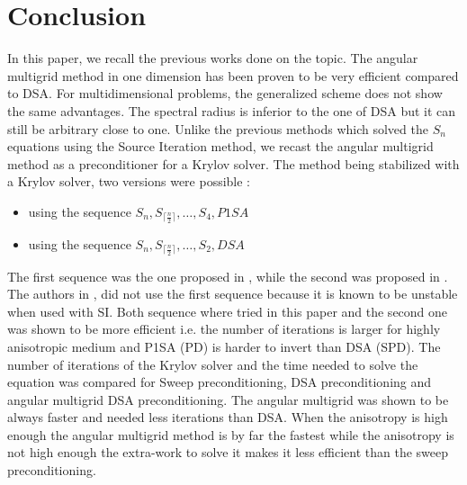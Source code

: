 \section{Conclusion}
In this paper, we recall the previous works done on the topic. The angular
multigrid method in one dimension has been proven to be very efficient
compared to DSA. For multidimensional problems, the generalized scheme does
not show the same advantages. The spectral radius is inferior to the one of
DSA but it can still be arbitrary close to one. Unlike the previous methods
which solved the $S_n$ equations using the Source Iteration method, we
recast the angular multigrid method as a preconditioner for a Krylov solver.
The method being stabilized with a Krylov solver, two versions were possible :
\begin{itemize}
\item using the sequence $S_n,S_{\lceil\frac{n}{2}\rceil},\hdots,S_4,P1SA$ 
\item using the sequence $S_n,S_{\lceil\frac{n}{2}\rceil},\hdots,S_2,DSA$
\end{itemize}
The first sequence was the one proposed in \cite{multigrid_1d}, while the
second was proposed in \cite{multigrid_2d}. The authors in
\cite{multigrid_2d}, did not use the first sequence because it is known to be
unstable when used with SI. Both sequence where tried in this paper and the
second one was shown to be more efficient i.e. the number of iterations is
larger for highly anisotropic medium and P1SA (PD) is harder to invert than
DSA (SPD). The number of iterations of the Krylov solver and the time needed
to solve the equation was compared for Sweep preconditioning, DSA
preconditioning and angular multigrid DSA preconditioning. The angular
multigrid was shown to be always faster and needed less iterations than DSA.
When the anisotropy is high enough the angular multigrid method is by far the
fastest while the anisotropy is not high enough the extra-work to solve it
makes it less efficient than the sweep preconditioning.
